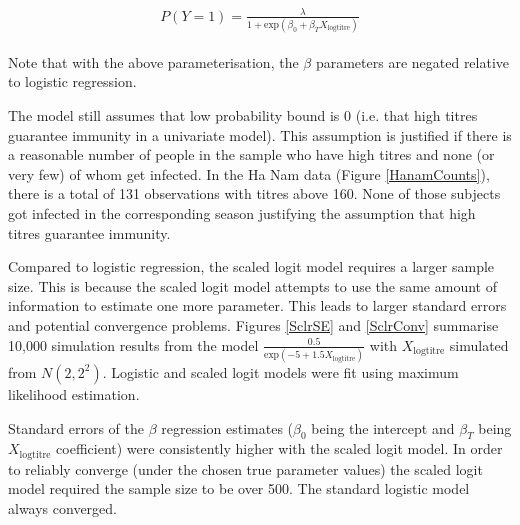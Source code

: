 \documentclass[12pt]{article}
\begin{document}
\begin{align*}
\begin{gathered}
P(Y=1) = \frac{\lambda}{1 + \text{exp}(\beta_0 + \beta_T X_{\text{logtitre}})}
\end{gathered}
\end{align*}

Note that with the above parameterisation, the $\beta$ parameters are negated relative to logistic regression.

The model still assumes that low probability bound is 0 (i.e. that high titres guarantee immunity in a univariate model). This assumption is justified if there is a reasonable number of people in the sample who have high titres and none (or very few) of whom get infected. In the Ha Nam data (Figure \ref{HanamCounts}), there is a total of 131 observations with titres above 160. None of those subjects got infected in the corresponding season justifying the assumption that high titres guarantee immunity.

Compared to logistic regression, the scaled logit model requires a larger sample size. This is because the scaled logit model attempts to use the same amount of information to estimate one more parameter. This leads to larger standard errors and potential convergence problems. Figures \ref{SclrSE} and \ref{SclrConv} summarise 10,000 simulation results from the model $\frac{0.5}{\text{exp}(-5 + 1.5 X_{\text{logtitre}})}$ with $X_{\text{logtitre}}$ simulated from $N(2, 2^2)$. Logistic and scaled logit models were fit using maximum likelihood estimation. 

Standard errors of the $\beta$ regression estimates ($\beta_0$ being the intercept and $\beta_T$ being $X_{\text{logtitre}}$ coefficient) were consistently higher with the scaled logit model. In order to reliably converge (under the chosen true parameter values) the scaled logit model required the sample size to be over 500. The standard logistic model always converged.

\pagebreak
\end{document}
